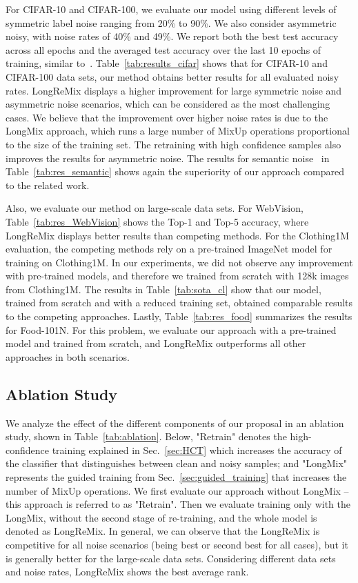 \documentclass{article}
\begin{document}
For CIFAR-10 and CIFAR-100, we evaluate our model using different levels of symmetric label noise ranging from 20\% to 90\%. We also consider asymmetric noisy, with noise rates of 40\% and 49\%. 
We report both the best test accuracy across all epochs and the averaged test accuracy over the last 10 epochs of training, similar to~\cite{li2020dividemix}. Table~\ref{tab:results_cifar} shows that for CIFAR-10 and CIFAR-100 data sets, our method obtains better results for all evaluated noisy rates. LongReMix displays a higher improvement for large symmetric noise and asymmetric noise scenarios, which can be considered as the most challenging cases. We believe that the improvement over higher noise rates is due to the LongMix approach, which runs a large number of MixUp operations proportional to the size of the training set. The retraining with high confidence samples also improves the results for asymmetric noise. The results for semantic noise~\cite{rog} in
Table~\ref{tab:res_semantic} shows again the superiority of our approach compared to the related work.

Also, we evaluate our method on large-scale data sets. For WebVision, 
Table~\ref{tab:res_WebVision} shows the Top-1 and Top-5 accuracy, where LongReMix displays better results than competing methods. 
For the Clothing1M evaluation, 
the competing methods rely on a pre-trained ImageNet model for training on Clothing1M. In our experiments, we did not observe any improvement with pre-trained models, and therefore we trained from scratch with 128k images from Clothing1M. The results in Table~\ref{tab:sota_cl} show that our model, trained from scratch and with a reduced training set, obtained comparable results to the competing approaches. Lastly, Table~\ref{tab:res_food} summarizes the results for Food-101N. 
For this problem, we evaluate our approach with a pre-trained model and trained from scratch, and LongReMix outperforms all other approaches in both scenarios.





\subsection{Ablation Study}

We analyze the effect of the different components of our proposal in an ablation study, shown in Table~\ref{tab:ablation}. 
Below, "Retrain" denotes the high-confidence training explained in Sec.~\ref{sec:HCT} which increases the accuracy of the classifier that distinguishes between clean and noisy samples; and "LongMix" represents the guided training from Sec.~\ref{sec:guided_training} that increases the number of MixUp operations.
We first evaluate our approach without LongMix -- this approach is referred to as "Retrain". 
Then we evaluate training only with the LongMix, without the second stage of re-training, and the whole model is denoted as LongReMix. 
In general, we can observe that the LongReMix is competitive for all noise scenarios (being best or second best for all cases), but it is generally better for the large-scale data sets.
Considering
different data sets and noise rates, LongReMix shows the best average rank.
\end{document}

